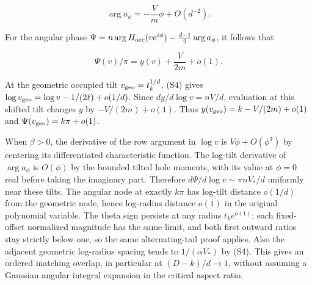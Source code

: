 \begin{equation*}
\arg a_\phi=-\frac{V}{m}\phi+O(d^{-2}).
\end{equation*}

For the angular phase $\Psi=n\arg H_{\rm occ}(ve^{i\phi})-\tfrac{d-1}{2}\arg a_\phi$, it follows that

\begin{equation}
\Psi(v)/\pi=y(v)+\frac{V}{2m}+o(1).
\tag{S5}
\end{equation}

At the geometric occupied tilt $v_{\rm geo}=t_k^{1/d}$, (S4) gives $\log v_{\rm geo}=\log v-1/(2\ell)+o(1/d)$. Since $d y/d\log v=nV/d$, evaluation at this shifted tilt changes $y$ by $-V/(2m)+o(1)$. Thus $y(v_{\rm geo})=k-V/(2m)+o(1)$ and $\Psi(v_{\rm geo})=k\pi+o(1)$.

When $\beta>0$, the derivative of the row argument in $\log v$ is $V\phi+O(\phi^3)$ by centering its differentiated characteristic function. The log-tilt derivative of $\arg a_\phi$ is $O(\phi)$ by the bounded tilted hole moments, with its value at $\phi=0$ real before taking the imaginary part. Therefore $d\Psi/d\log v\sim\pi n V_*/d$ uniformly near these tilts. The angular node at exactly $k\pi$ has log-tilt distance $o(1/d)$ from the geometric node, hence log-radius distance $o(1)$ in the original polynomial variable. The theta sign persists at any radius $t_ke^{o(1)}$: each fixed-offset normalized magnitude has the same limit, and both first outward ratios stay strictly below one, so the same alternating-tail proof applies. Also the adjacent geometric log-radius spacing tends to $1/(\alpha V_*)$ by (S4). This gives an ordered matching overlap, in particular at $(D-k)/d\to1$, without assuming a Gaussian angular integral expansion in the critical aspect ratio.
